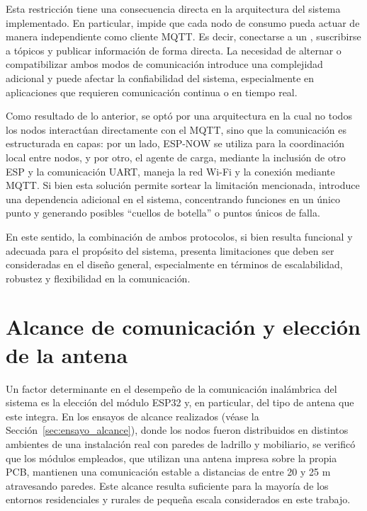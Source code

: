 Esta restricción tiene una consecuencia directa en la arquitectura del sistema implementado. En particular, impide que cada nodo de consumo pueda actuar de manera independiente como cliente MQTT. Es decir, conectarse a un , suscribirse a tópicos y publicar información de forma directa. La necesidad de alternar o compatibilizar ambos modos de comunicación introduce una complejidad adicional y puede afectar la confiabilidad del sistema, especialmente en aplicaciones que requieren comunicación continua o en tiempo real.

Como resultado de lo anterior, se optó por una arquitectura en la cual no todos los nodos interactúan directamente con el  MQTT, sino que la comunicación es estructurada en capas: por un lado, ESP-NOW se utiliza para la coordinación local entre nodos, y por otro, el agente de carga, mediante la inclusión de otro ESP y la comunicación UART, maneja la red Wi-Fi y la conexión mediante MQTT. Si bien esta solución permite sortear la limitación mencionada, introduce una dependencia adicional en el sistema, concentrando funciones en un único punto y generando posibles ``cuellos de botella'' o puntos únicos de falla.

En este sentido, la combinación de ambos protocolos, si bien resulta funcional y adecuada para el propósito del sistema, presenta limitaciones que deben ser consideradas en el diseño general, especialmente en términos de escalabilidad, robustez y flexibilidad en la comunicación.

\section{Alcance de comunicación y elección de la antena}

Un factor determinante en el desempeño de la comunicación inalámbrica del sistema es la elección del módulo ESP32 y, en particular, del tipo de antena que este integra. En los ensayos de alcance realizados (véase la Sección~\ref{sec:ensayo_alcance}), donde los nodos fueron distribuidos en distintos ambientes de una instalación real con paredes de ladrillo y mobiliario, se verificó que los módulos empleados, que utilizan una antena impresa sobre la propia PCB, mantienen una comunicación estable a distancias de entre 20 y 25 m atravesando paredes. Este alcance resulta suficiente para la mayoría de los entornos residenciales y rurales de pequeña escala considerados en este trabajo.

